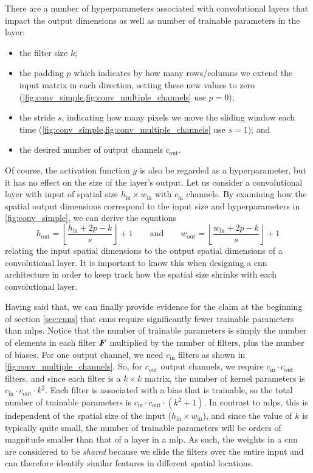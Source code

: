 \documentclass[../main.tex]{subfiles}
\begin{document}
There are a number of hyperparameters associated with convolutional layers that impact the output dimensions as well as number of trainable parameters in the layer:
\begin{itemize}
    \item the filter size $k$;
    \item the padding $p$ which indicates by how many rows/columns we extend the input matrix in each direction, setting these new values to zero (\cref{fig:conv_simple,fig:conv_multiple_channels} use $p=0$);
    \item the stride $s$, indicating how many pixels we move the sliding window each time (\cref{fig:conv_simple,fig:conv_multiple_channels} use $s=1$); and
    \item the desired number of output channels $c_\text{out}$.
\end{itemize}
Of course, the activation function $g$ is also be regarded as a hyperparameter, but it has no effect on the size of the layer's output.
Let us consider a convolutional layer with input of spatial size $h_\text{in} \times w_\text{in}$ with $c_\text{in}$ channels.
By examining how the spatial output dimensions correspond to the input size and hyperparameters in \cref{fig:conv_simple}, we can derive the equations
\begin{equation}
    \label{eq:cnn_output_size}
    h_\text{out} = \left\lfloor \frac{h_\text{in} + 2p - k }{s} \right\rfloor + 1 \qquad \text{and} \qquad
    w_\text{out} = \left\lfloor \frac{w_\text{in} + 2p - k }{s} \right\rfloor + 1
\end{equation}
relating the input spatial dimensions to the output spatial dimensions of a convolutional layer.
It is important to know this when designing a \gls{cnn} architecture in order to keep track how the spatial size shrinks with each convolutional layer.

Having said that, we can finally provide evidence for the claim at the beginning of section \cref{sec:cnns} that \glspl{cnn} require significantly fewer trainable parameters than \glspl{mlp}.
Notice that the number of trainable parameters is simply the number of elements in each filter ${\bm{F}}$ multiplied by the number of filters, plus the number of biases.
For one output channel, we need $c_\text{in}$ filters as shown in \cref{fig:conv_multiple_channels}.
So, for $c_\text{out}$ output channels, we require $c_\text{in} \cdot c_\text{out}$ filters, and since each filter is a $k \times k$ matrix, the number of kernel parameters is
$c_\text{in} \cdot c_\text{out} \cdot k^2$.
Each filter is associated with a bias that is trainable, so the total number of trainable parameters is 
$c_\text{in} \cdot c_\text{out} \cdot (k^2+1)$.
In contrast to \glspl{mlp}, this is independent of the spatial size of the input ($h_\text{in} \times w_\text{in}$), and since the value of $k$ is typically quite small, the number of trainable parameters will be orders of magnitude smaller than that of a layer in a \gls{mlp}.
As such, the weights in a \gls{cnn} are considered to be \emph{shared} because we slide the filters over the entire input and can therefore identify similar features in different spatial locations.
\end{document}
